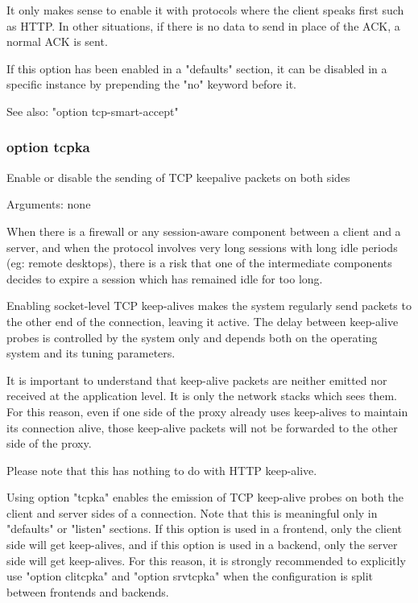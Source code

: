   It only makes sense to enable it with protocols where the client speaks first
  such as HTTP. In other situations, if there is no data to send in place of
  the ACK, a normal ACK is sent.

  If this option has been enabled in a "defaults" section, it can be disabled
  in a specific instance by prepending the "no" keyword before it.

  See also: "option tcp-smart-accept"


\subsubsection{option tcpka}


  Enable or disable the sending of TCP keepalive packets on both sides


  Arguments: none

  When there is a firewall or any session-aware component between a client and
  a server, and when the protocol involves very long sessions with long idle
  periods (eg: remote desktops), there is a risk that one of the intermediate
  components decides to expire a session which has remained idle for too long.

  Enabling socket-level TCP keep-alives makes the system regularly send packets
  to the other end of the connection, leaving it active. The delay between
  keep-alive probes is controlled by the system only and depends both on the
  operating system and its tuning parameters.

  It is important to understand that keep-alive packets are neither emitted nor
  received at the application level. It is only the network stacks which sees
  them. For this reason, even if one side of the proxy already uses keep-alives
  to maintain its connection alive, those keep-alive packets will not be
  forwarded to the other side of the proxy.

  Please note that this has nothing to do with HTTP keep-alive.

  Using option "tcpka" enables the emission of TCP keep-alive probes on both
  the client and server sides of a connection. Note that this is meaningful
  only in "defaults" or "listen" sections. If this option is used in a
  frontend, only the client side will get keep-alives, and if this option is
  used in a backend, only the server side will get keep-alives. For this
  reason, it is strongly recommended to explicitly use "option clitcpka" and
  "option srvtcpka" when the configuration is split between frontends and
  backends.

